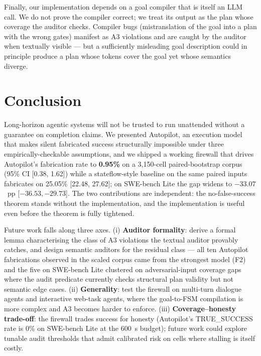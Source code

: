 Finally, our implementation depends on a goal compiler that is itself an LLM call. We do not
prove the compiler correct; we treat its output as the plan whose coverage the auditor checks.
Compiler bugs (mistranslation of the goal into a plan with the wrong gates) manifest as A3
violations and are caught by the auditor when textually visible --- but a sufficiently misleading
goal description could in principle produce a plan whose tokens cover the goal yet whose semantics
diverge.



\section{Conclusion}\label{conclusion}

Long-horizon agentic systems will not be trusted to run unattended without a guarantee on
completion claims. We presented Autopilot, an execution model that makes silent fabricated
success structurally impossible under three empirically-checkable assumptions, and we shipped
a working firewall that drives Autopilot's fabrication rate to \textbf{0.95\%} on a 3{,}150-cell
paired-bootstrap corpus (95\% CI [0.38, 1.62]) while a stateflow-style baseline on the same
paired inputs fabricates on 25.05\% [22.48, 27.62]; on SWE-bench Lite the gap widens to
$-33.07$~pp [$-36.53, -29.73$]. The two contributions are independent: the no-false-success
theorem stands without the implementation, and the implementation is useful even before the
theorem is fully tightened.

Future work falls along three axes. (i) \textbf{Auditor formality}: derive a formal lemma characterising the class of A3 violations the textual auditor
provably catches, and design semantic auditors for the residual class --- all ten
Autopilot fabrications observed in the scaled corpus came from the strongest model
(F2) and the five on SWE-bench Lite clustered on adversarial-input coverage gaps where
the audit predicate currently checks structural plan validity but not semantic edge
cases. (ii) \textbf{Generality}: test the firewall on
multi-turn dialogue agents and interactive web-task agents, where the goal-to-FSM compilation
is more complex and A3 becomes harder to enforce. (iii) \textbf{Coverage--honesty trade-off}:
the firewall trades success for honesty (Autopilot's TRUE\_SUCCESS rate is 0\% on SWE-bench
Lite at the 600~s budget); future work could explore tunable audit thresholds that admit
calibrated risk on cells where stalling is itself costly.



